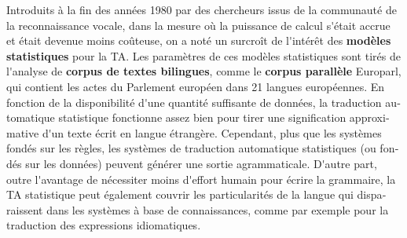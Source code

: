 \begin{french}
\begin{multicols}{2}
Introduits à la fin des années 1980 par des chercheurs issus de la
communauté de la reconnaissance vocale, dans la mesure où la puissance
de calcul s{\mbox '}était accrue et était devenue moins coûteuse, on a noté un
surcroît de l{\mbox '}intérêt des {\bf modèles statistiques} pour la TA. Les
paramètres de ces modèles statistiques sont tirés de l{\mbox '}analyse de
{\bf corpus de textes bilingues}, comme le {\bf corpus parallèle} Europarl, qui
contient les actes du Parlement européen dans 21 langues
européennes. En fonction de la disponibilité d{\mbox '}une quantité suffisante
de données, la traduction automatique statistique fonctionne assez bien pour tirer une
signification approximative d{\mbox '}un texte écrit en langue
étrangère. Cependant, plus que les systèmes fondés sur les règles, les
systèmes de traduction automatique statistiques (ou fondés sur les données) peuvent
générer une sortie agrammaticale. D{\mbox '}autre part, outre l{\mbox '}avantage de
nécessiter moins d{\mbox '}effort humain pour écrire la grammaire, la TA
statistique peut également couvrir les particularités de la langue qui
disparaissent dans les systèmes à base de connaissances, comme par
exemple pour la traduction des expressions idiomatiques.


\end{multicols}
\end{french}
